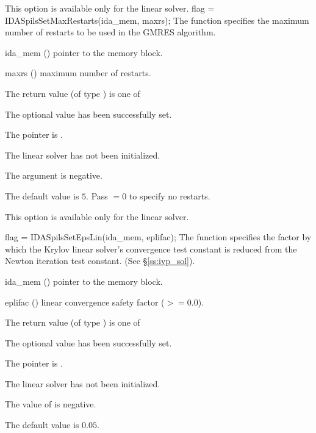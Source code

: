 {{  {\warn}This option is available only for the {\idaspgmr} linear solver.
}
{
  flag = IDASpilsSetMaxRestarts(ida\_mem, maxrs);
}
{
  The function  specifies the maximum number of 
  restarts to be used in the GMRES algorithm.
}
{
  \begin{args}
  \item[ida\_mem] ()
    pointer to the {\idas} memory block.
  \item[maxrs] ()
    maximum number of restarts.
  \end{args}
}
{
  The return value  (of type ) is one of
  \begin{args}
  \item[\Id{IDASPILS\_SUCCESS}] 
    The optional value has been successfully set.
  \item[\Id{IDASPILS\_MEM\_NULL}]
    The  pointer is .
  \item[\Id{IDASPILS\_LMEM\_NULL}]
    The {\idaspils} linear solver has not been initialized.
  \item[\Id{IDASPILS\_ILL\_INPUT}]
    The  argument is negative.
  \end{args}
}
{
  The default value is $5$. Pass  $=0$ to specify no restarts.

  {\warn}This option is available only for the {\idaspgmr} linear solver.
}
{
  flag = IDASpilsSetEpsLin(ida\_mem, eplifac);
}
{
  The function  specifies the factor by
  which the Krylov linear solver's convergence test constant is reduced
  from the Newton iteration test constant. (See \S\ref{ss:ivp_sol}).
}
{
  \begin{args}
  \item[ida\_mem] ()
    pointer to the {\idas} memory block.
  \item[eplifac] ()
    linear convergence safety factor ($>= 0.0$).
  \end{args}
}
{
  The return value  (of type ) is one of
  \begin{args}
  \item[\Id{IDASPILS\_SUCCESS}] 
    The optional value has been successfully set.
  \item[\Id{IDASPILS\_MEM\_NULL}]
    The  pointer is .
  \item[\Id{IDASPILS\_LMEM\_NULL}]
    The {\idaspils} linear solver has not been initialized.
  \item[\Id{IDASPILS\_ILL\_INPUT}]
    The value of  is negative.
  \end{args}
}
{
  The default value is $0.05$.

}}
